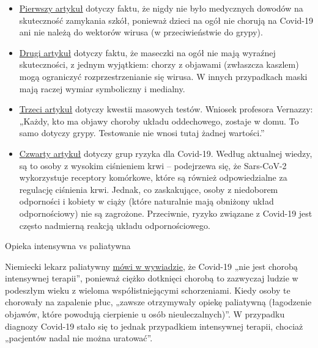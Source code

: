 \begin{itemize}
\tightlist
\item
  \href{https://infekt.ch/2020/04/schulen-schliessen-hilfreich-oder-nicht/}{Pierwszy
  artykuł} dotyczy faktu, że nigdy nie było medycznych dowodów na
  skuteczność zamykania szkół, ponieważ dzieci na ogół nie chorują na
  Covid-19 ani nie należą do wektorów wirusa (w przeciwieństwie do
  grypy).
\item
  \href{https://infekt.ch/2020/04/atemschutzmasken-fuer-alle-medienhype-oder-unverzichtbar/}{Drugi
  artykuł} dotyczy faktu, że maseczki na ogół nie mają wyraźnej
  skuteczności, z jednym wyjątkiem: chorzy z objawami (zwłaszcza
  kaszlem) mogą ograniczyć rozprzestrzenianie się wirusa. W innych
  przypadkach maski mają raczej wymiar symboliczny i medialny.
\item
  \href{https://infekt.ch/2020/04/corona-testen-testen-und-kein-ende/}{Trzeci
  artykuł} dotyczy kwestii masowych testów. Wniosek profesora Vernazzy:
  „Każdy, kto ma objawy choroby układu oddechowego, zostaje w domu. To
  samo dotyczy grypy. Testowanie nie wnosi tutaj żadnej wartości.''
\item
  \href{https://infekt.ch/2020/03/immunschwaeche-und-schwangerschaft-kein-covid-19-risikofaktor/}{Czwarty
  artykuł} dotyczy grup ryzyka dla Covid-19. Według aktualnej wiedzy, są
  to osoby z wysokim ciśnieniem krwi -- podejrzewa się, że Sars-CoV-2
  wykorzystuje receptory komórkowe, które są również odpowiedzialne za
  regulację ciśnienia krwi. Jednak, co zaskakujące, osoby z niedoborem
  odporności i kobiety w ciąży (które naturalnie mają obniżony układ
  odpornościowy) nie są zagrożone. Przeciwnie, ryzyko związane z
  Covid-19 jest często nadmierną reakcją układu odpornościowego.
\end{itemize}

Opieka intensywna vs paliatywna

Niemiecki lekarz paliatywny
\href{https://www.ruhr24.de/ruhrgebiet/coronavirus-behandlung-intensivstation-nrw-lungenentzuendung-matthias-thoens-witten-zr-13645038.html}{mówi
w wywiadzie}, że Covid-19 „nie jest chorobą intensywnej terapii'',
ponieważ ciężko dotknięci chorobą to zazwyczaj ludzie w podeszłym wieku
z wieloma współistniejącymi schorzeniami. Kiedy osoby te chorowały na
zapalenie płuc, „zawsze otrzymywały opiekę paliatywną (łagodzenie
objawów, które powodują cierpienie u osób nieuleczalnych)''. W przypadku
diagnozy Covid-19 stało się to jednak przypadkiem intensywnej terapii,
chociaż „pacjentów nadal nie można uratować''.

